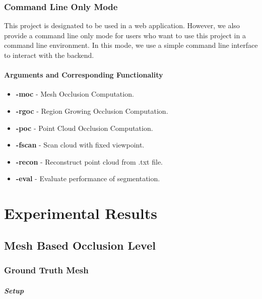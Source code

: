 \documentclass[11pt, a4paper,oneside,chapterprefix=false]{scrbook}
\begin{document}
\subsection{Command Line Only Mode}

This project is designated to be used in a web application. However, we also provide a command line only mode for users who want to use this project in a command line environment. In this mode, we use a simple command line interface to interact with the backend.

\subsubsection{Arguments and Corresponding Functionality}

\begin{itemize}
	\item \textbf{-moc} - Mesh Occlusion Computation.
	\item \textbf{-rgoc} - Region Growing Occlusion Computation.
	\item \textbf{-poc} - Point Cloud Occlusion Computation.
	\item \textbf{-fscan} - Scan cloud with fixed viewpoint.
	\item \textbf{-recon} - Reconstruct point cloud from .txt file.
	\item \textbf{-eval} - Evaluate performance of segmentation.
\end{itemize}


\chapter{Experimental Results} \label{chp:experimental results}


\section{Mesh Based Occlusion Level}

\subsection{Ground Truth Mesh}

\paragraph{Setup}
\end{document}
